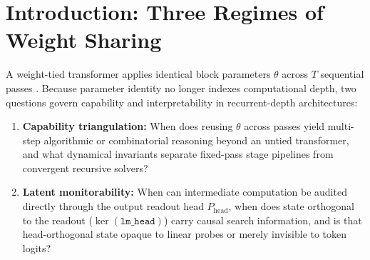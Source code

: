 \documentclass[10pt,letterpaper]{article}
\newcommand{\Phead}{P_{\mathrm{head}}}
\begin{document}
\begin{abstract}
$\times$ 21 core calls $= 336$ passes) solves $88.3\%$ ($226/256$) of \texttt{items256} and $100\%$ ($100/100$) of \texttt{bench100} ($92/100 = 92.0\%$ on an independent replication checkpoint), including $51/51$ (\texttt{bench100}) and $153/183 = 83.6\%$ (\texttt{items256}) whole-board deductively stalled puzzles. Visible beliefs commute with exact propagation before stall ($\mathrm{AUC}=1.000$). While naive unnormalized projection onto the 11-d \texttt{lm\_head} row space collapses solve ($1.000 \to 0.050$--$0.070$) via off-manifold norm loss, restoring per-cell L2 norm, train-mean offset, or donor fibers preserves $100\%$ ($73/73$) of propagation-solvable boards and $74.9\%$--$76.0\%$ of stalled \texttt{items256} boards via continuous $81\times 11$ logit fields, isolating a selective $-7.7$ to $-8.7$~pp deficit on stalled boards ($p \le 0.0043$; $-15.6$~pp on round-0 stalled \texttt{S4}, $-21.9$~pp under step-1 fiber freeze, $p=1.08\times 10^{-6}$) that recovers completely with the top $k=64$ orthogonal PCA directions ($p=1.00$) and remains linearly probe-decodable ($97.1\%$--$97.8\%$ step-1 candidate masks; $93.5\%$--$100\%$ step-16 digits).
\end{abstract}

\section{Introduction: Three Regimes of Weight Sharing}\label{sec:intro}

A weight-tied transformer applies identical block parameters $\theta$ across $T$ sequential passes \cite{dehghani2019universal,giannou2023looped,saunshi2025latent,geiping2025huginn,wang2025hrm,jolicoeur2025trm,li2026deeploop}. Because parameter identity no longer indexes computational depth, two questions govern capability and interpretability in recurrent-depth architectures:
\begin{enumerate}[topsep=3pt,itemsep=2pt]
  \item \textbf{Capability triangulation:} When does reusing $\theta$ across passes yield multi-step algorithmic or combinatorial reasoning beyond an untied transformer, and what dynamical invariants separate fixed-pass stage pipelines from convergent recursive solvers?
  \item \textbf{Latent monitorability:} When can intermediate computation be audited directly through the output readout head $\Phead$, when does state orthogonal to the readout ($\ker(\texttt{lm\_head})$) carry causal search information, and is that head-orthogonal state opaque to linear probes or merely invisible to token logits?
\end{enumerate}
\end{document}
